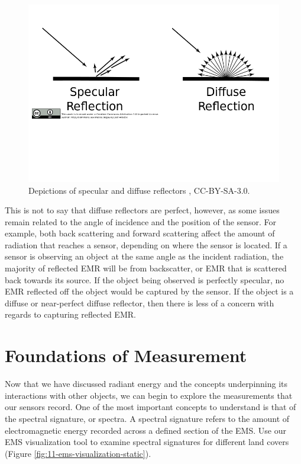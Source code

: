 \documentclass[
]{book}
\begin{document}
\begin{figure}
\includegraphics[width=0.75\linewidth]{images/11-reflectors} \caption{Depictions of specular and diffuse reflectors \citep{beck_specular_2012}, CC-BY-SA-3.0.}\label{fig:11-reflectors}
\end{figure}

This is not to say that diffuse reflectors are perfect, however, as some issues remain related to the angle of incidence and the position of the sensor. For example, both back scattering and forward scattering affect the amount of radiation that reaches a sensor, depending on where the sensor is located. If a sensor is observing an object at the same angle as the incident radiation, the majority of reflected EMR will be from backscatter, or EMR that is scattered back towards its source. If the object being observed is perfectly specular, no EMR reflected off the object would be captured by the sensor. If the object is a diffuse or near-perfect diffuse reflector, then there is less of a concern with regards to capturing reflected EMR.

\section{Foundations of Measurement}\label{foundations-of-measurement}

Now that we have discussed radiant energy and the concepts underpinning its interactions with other objects, we can begin to explore the measurements that our sensors record. One of the most important concepts to understand is that of the spectral signature, or spectra. A spectral signature refers to the amount of electromagnetic energy recorded across a defined section of the EMS. Use our EMS visualization tool to examine spectral signatures for different land covers (Figure \ref{fig:11-ems-visualization-static}).
\end{document}
